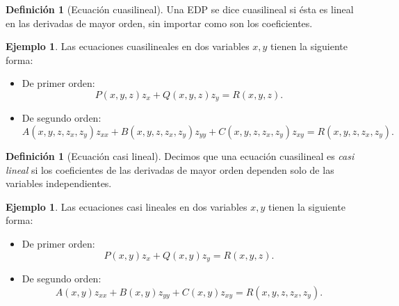 \documentclass[11pt,letterpaper,draft]{report}
\theoremstyle{plain}
\theoremstyle{definition}
\newtheorem{definition}[theorem]{Definición}
\newtheorem{example}[theorem]{Ejemplo}
\theoremstyle{remark}
\newcommand\<{\langle}
\renewcommand\>{\rangle}
\begin{document}
\begin{definition}[Ecuación cuasilineal]
  Una EDP se dice cuasilineal si ésta es lineal en las
  derivadas de mayor orden, sin importar como son los coeficientes.
\end{definition}

\begin{example}
  Las ecuaciones cuasilineales en dos variables \(x,y\) tienen la
  siguiente forma:
  \begin{itemize}
    \item
      De primer orden:
      \[
        P(x,y,z)z_x + Q(x,y,z) z_y = R(x,y,z).
      \] 
    \item
      De segundo orden:
      \[
        A(x,y,z,z_x,z_y) z_{xx}
        +
        B(x,y,z,z_x,z_y) z_{yy}
        +
        C(x,y,z,z_x,z_y) z_{xy}
        = R(x,y,z,z_x,z_y).
      \] 
  \end{itemize}
\end{example}

\begin{definition}[Ecuación casi lineal]
  Decimos que una ecuación cuasilineal es \emph{casi lineal} si
  los coeficientes de las derivadas de mayor orden dependen solo de
  las variables independientes.
\end{definition}

\begin{example}
  Las ecuaciones casi lineales en dos variables \(x,y\) tienen la
  siguiente forma:
  \begin{itemize}
    \item
      De primer orden:
      \[
        P(x,y)z_x + Q(x,y) z_y = R(x,y,z).
      \] 
    \item
      De segundo orden:
      \[
        A(x,y) z_{xx} + B(x,y) z_{yy} +
        C(x,y) z_{xy} = R(x,y,z,z_x,z_y).
      \] 
  \end{itemize}
\end{example}
\end{document}
